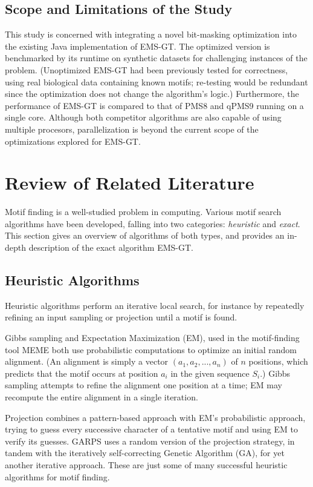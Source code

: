 \documentclass[oneside,12pt]{DISCSthesis}
\begin{document}
	\section{Scope and Limitations of the Study}
		This study is concerned with integrating a novel bit-masking optimization into the existing Java implementation of EMS-GT. The optimized version is benchmarked by its runtime on synthetic datasets for challenging instances of the problem. (Unoptimized EMS-GT had been previously tested for correctness, using real biological data containing known motifs; re-testing would be redundant since the optimization does not change the algorithm's logic.)	
		Furthermore, the performance of EMS-GT is compared to that of PMS8 and qPMS9 running on a single core. Although both competitor algorithms are also capable of using multiple procesors, parallelization is beyond the current scope of the optimizations explored for EMS-GT.

\chapter{Review of Related Literature}
	Motif finding is a well-studied problem in computing. Various motif search algorithms have been developed,
	falling into two categories: \emph{heuristic} and \emph{exact}. This section gives an overview of algorithms
	of both types, and provides an in-depth description of the exact algorithm EMS-GT.
	
	\section{Heuristic Algorithms}
		Heuristic algorithms perform an iterative local search, for instance by repeatedly refining an input sampling or projection until 
		a motif is found. 

		Gibbs sampling \cite{lawrence1993detecting} and Expectation Maximization (EM), used in the motif-finding tool MEME \cite{lawrence1990expectation,bailey1995unsupervised} both use probabilistic computations to optimize an initial random alignment. (An alignment is simply a vector $(a_{1}, a_{2},...,a_{n})$ of $n$ positions, which predicts that the motif occurs at position $a_{i}$ in the given sequence $S_{i}$.) Gibbs sampling attempts to refine the alignment one position at a time; %
		EM may recompute the entire alignment in a single iteration. 

		Projection \cite{blanchette2002discovery} combines a pattern-based approach with EM's probabilistic approach, trying to guess every successive character of a tentative motif and using EM to verify its guesses. GARPS \cite{huo2009combining} uses a random version of the projection strategy, in tandem with the iteratively self-correcting Genetic Algorithm (GA), for yet another iterative approach. These are just some of many successful heuristic algorithms for motif finding.
\end{document}
